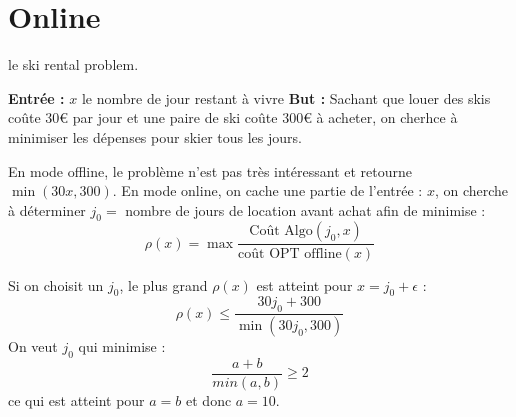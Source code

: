 \documentclass[a4paper, 11pt]{thesis}
\begin{document}
\chapter{Online}

\begin{ex}[Introduction :]
    le ski rental problem.

    \textbf{Entrée : } $x$ le nombre de jour restant à vivre
    \textbf{But : } Sachant que louer des skis coûte 30€ par jour et une paire de ski coûte 300€ à
    acheter, on cherhce à minimiser les dépenses pour skier tous les jours.

    En mode offline, le problème n'est pas très intéressant et retourne $\min(30x, 300)$.
    En mode online, on cache une partie de l'entrée : $x$, on cherche à déterminer $j_0 = $ nombre
    de jours de location avant achat afin de minimise : \begin{displaymath}
        \rho(x) = \max \frac{\mbox{Coût Algo}(j_0, x)}{\mbox{coût OPT offline}(x)}
    \end{displaymath}

    Si on choisit un $j_0$, le plus grand $\rho(x)$ est atteint pour $x = j_0 + \epsilon$
    :\begin{displaymath}
        \rho(x) \leq \frac{30 j_0 + 300}{\min(30 j_0, 300)}
    \end{displaymath}
     On veut $j_0$ qui minimise : \begin{displaymath}
         \frac{a + b}{min(a,b)} \geq 2
     \end{displaymath}
     ce qui est atteint pour $a = b$ et donc $a = 10$.
 \end{ex}
\end{document}
